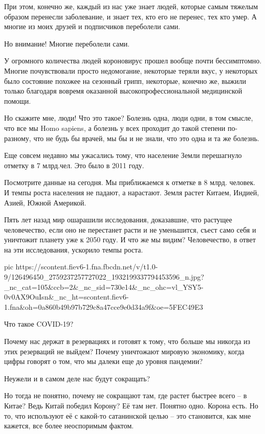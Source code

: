При этом, конечно же, каждый из нас уже знает людей, которые самым тяжелым
образом перенесли заболевание, и знает тех, кто его не перенес, тех кто умер. А
многие из моих друзей и подписчиков переболели сами. 

Но внимание! Многие переболели сами. 

У огромного количества людей короновирус прошел вообще почти бессимптомно.
Многие почувствовали просто недомогание, некоторые теряли вкус, у некоторых
было состояние похожее на сезонный грипп, некоторые, конечно же, выжили только
благодаря вовремя оказанной высокопрофессиональной медицинской помощи. 

Но скажите мне, люди! Что это такое? Болезнь одна, люди одни, в том смысле, что
все мы  Homo sapiens, а болезнь у всех проходит до такой степени по-разному,
что не будь бы врачей, мы бы и не знали, что это одна и та же болезнь. 

Еще совсем недавно мы ужасались тому, что население Земли перешагнуло отметку в 7 млрд.чел. Это было в 2011 году. 

Посмотрите данные на сегодня. Мы приближаемся к отметке в 8 млрд. человек. И
темпы роста населения не падают, а нарастают. Земля растет Китаем, Индией,
Азией, Южной Америкой. 

Пять лет назад мир ошарашили исследования, доказавшие, что растущее
человечество, если оно не перестанет расти и не уменьшится, съест само себя и
уничтожит планету уже к 2050 году. И что же мы видим? Человечество, в ответ на
эти исследования, ускорило темпы роста. 

\ifcmt
pic https://scontent.fiev6-1.fna.fbcdn.net/v/t1.0-9/126496450_2759237257727022_1932199337794453596_n.jpg?_nc_cat=105&ccb=2&_nc_sid=730e14&_nc_ohc=vl_YSY5-0v0AX9OuIsn&_nc_ht=scontent.fiev6-1.fna&oh=0a860b49b97b729c8a47cce9e0d34a9f&oe=5FEC49E3
\fi

Что такое COVID-19? 

Почему нас держат в резервациях и готовят к тому, что больше мы никогда из этих
резерваций не выйдем? Почему уничтожают мировую экономику, когда цифры говорят
о том, что мы далеки еще до уровня пандемии? 

Неужели и в самом деле нас будут сокращать? 

Но тогда не понятно, почему не сокращают там, где растет быстрее всего – в
Китае? Ведь Китай победил Корону? Её там нет.  Понятно одно. Корона есть. Но
то, что используют её с какой-то сатанинской целью – это становится, как мне
кажется, все более неоспоримым фактом.
